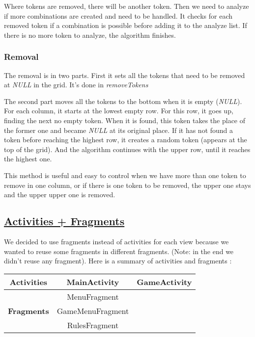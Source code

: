 \documentclass{article}
\begin{document}
Where tokens are removed, there will be another token. Then we need to analyze if more combinations are created and need to be handled. It checks for each removed token if a combination is possible before adding it to the analyze list. If there is no more token to analyze, the algorithm finishes.

\subsubsection{Removal}

The removal is in two parts. First it sets all the tokens that need to be removed at \textit{NULL} in the grid. It's done in \textit{removeTokens}

The second part moves all the tokens to the bottom when it is empty (\textit{NULL}). For each column, it starts at the lowest empty row. For this row, it goes up, finding the next no empty token. When it is found, this token takes the place of the former one and became \textit{NULL} at its original place. If it has not found a token before reaching the highest row, it creates a random token (appears at the top of the grid). And the algorithm continues with the upper row, until it reaches the highest one.

This method is useful and easy to control when we have more than one token to remove in one column, or if there is one token to be removed, the upper one stays and the upper upper one is removed.

\subsection{\href{http://data.whicdn.com/images/28718572/large.gif}{Activities + Fragments}}

We decided to use fragments instead of activities for each view because we wanted to reuse some fragments in different fragments. (Note: in the end we didn't reuse any fragment). Here is a summary of activities and fragments :

\begin{tabular}{|c|c|c|}
\hline
\textbf{Activities} & MainActivity & GameActivity \\
\hline
\multirow{3}{*}{\textbf{Fragments}} & MenuFragment & \multirow{3}{*}{} \\
&GameMenuFragment&\\
&RulesFragment&\\
\hline
\end{tabular}
\end{document}
